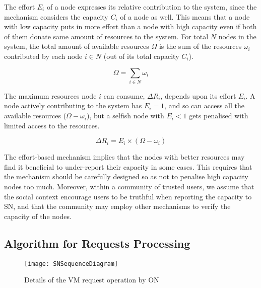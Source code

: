 The effort ${ E }_{ i }$ of a node expresses its relative contribution to the system, 
since the mechanism considers the capacity ${ C }_{ i }$ of a node as well. 
This means that a node with low capacity puts in more effort than a node with high capacity even if both of them donate same amount of resources to the system.
For total $N$ nodes in the system, the total amount of available resources ${\Omega}$ is the sum of the resources ${ { \omega } }_{ i }$ contributed by each node $i \in N$ (out of its total capacity ${ C }_{ i }$).

\begin{equation}
	\Omega =  \sum_{i \in N}{ { \omega  }_{ i } }
	\label{eq__total_resources}
\end{equation}

The maximum resources node $i$ can consume, ${ { \Delta R } }_{ i }$, depends upon its effort ${ E }_{ i }$.
A node actively contributing to the system has ${ E }_{ i } = 1$, and so can access all the available resources ($\Omega - { \omega  }_{ i }$), but a selfish node with ${ E }_{ i } < 1$ gets penalised with limited access to the resources.

\begin{equation}
	{ \Delta R }_{ i } ={ E }_{ i } \times ( \Omega - { \omega  }_{ i })
	\label{eq__node_requested_resources}
\end{equation}

The effort-based mechanism implies that the nodes with better resources may find it beneficial to under-report their capacity in some cases. 
This requires that the mechanism should be carefully designed so as not to penalise high capacity nodes too much. 
Moreover, within a community of trusted users, we assume that the social context encourage users to be truthful when reporting the capacity to SN, 
and that the community may employ other mechanisms to verify the capacity of the nodes.

\subsection{Algorithm for Requests Processing}

\begin{figure}[tbp]
	\centering
	\texttt{[image: SNSequenceDiagram]}
	\caption{Details of the VM request operation by ON}
	\label{fig:sequence-dig-controller-request}
\end{figure}


